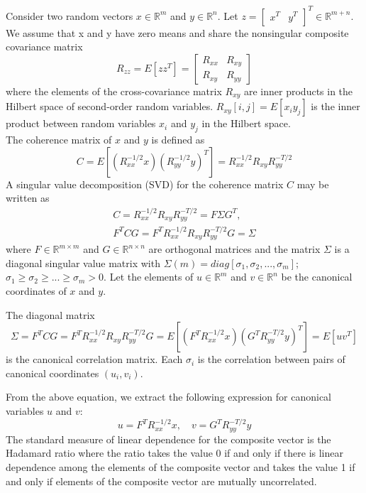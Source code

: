 \documentclass[12pt]{report} %
\begin{document}
Consider two random vectors $x\in \mathbb{R}^{m}$ and $y\in \mathbb{R}^{n}$. Let $z= \begin{bmatrix}x^T & y^T\end{bmatrix}^T \in \mathbb{R}^{m+n}$. We assume that x and y have zero means and share the nonsingular composite covariance matrix
\begin{equation}
R_{zz}=E[zz^T]=\begin{bmatrix}
R_{xx} & R_{xy} \\
R_{xy} & R_{yy}
\end{bmatrix}
\end{equation}
where the elements of the cross-covariance matrix $R_{xy}$ are inner products in the Hilbert space of second-order random variables. $R_{xy}[i,j]=E[x_{i}y_{j}]$ is the inner product between random variables $x_{i}$ and $y_{j}$ in the Hilbert space. \\
The coherence matrix of $x$ and $y$ is defined as
\begin{equation}
C=E[(R_{xx}^{-1/2}x)(R_{yy}^{-1/2}y)^T]=R_{xx}^{-1/2}R_{xy}R_{yy}^{-T/2}
\end{equation}
A singular value decomposition (SVD) for the coherence matrix $C$ may be written as
\begin{equation}
\begin{split}
C=R_{xx}^{-1/2}R_{xy}R_{yy}^{-T/2}=F\Sigma G^T, \\ F^TCG=F^TR_{xx}^{-1/2}R_{xy}R_{yy}^{-T/2}G=\Sigma
\end{split}
\end{equation}
where $F\in \mathbb{R}^{m\times m}$ and $G\in \mathbb{R}^{n\times n}$ are orthogonal matrices and the matrix $\Sigma$ is a diagonal singular value matrix with $\Sigma(m)=diag[\sigma_{1},\sigma_{2},...,\sigma_{m}]$; $\sigma_{1}\geq\sigma_{2}\geq...\geq\sigma_{m}>0$. Let the elements of $u\in \mathbb{R}^{m}$ and $v\in \mathbb{R}^{n}$ be the canonical coordinates of $x$ and $y$. 

The diagonal matrix
\begin{equation}
\Sigma=F^TCG=F^TR_{xx}^{-1/2}R_{xy}R_{yy}^{-T/2}G=E[(F^TR_{xx}^{-1/2}x)(G^TR_{yy}^{-T/2}y)^T]=E[uv^T]
\end{equation}
is the canonical correlation matrix. Each $\sigma_{i}$ is the correlation between pairs of canonical coordinates $(u_{i},v_{i})$. 

From the above equation, we extract the following expression for canonical variables $u$ and $v$:
\begin{equation}
u=F^TR_{xx}^{-1/2}x,\quad v=G^TR_{yy}^{-T/2}y
\end{equation}
The standard measure of linear dependence for the composite vector is the Hadamard ratio where the ratio takes the value 0 if and only if there is linear dependence among the elements of the composite vector and takes the value 1 if and only if elements of the composite vector are mutually uncorrelated. 
\end{document}
